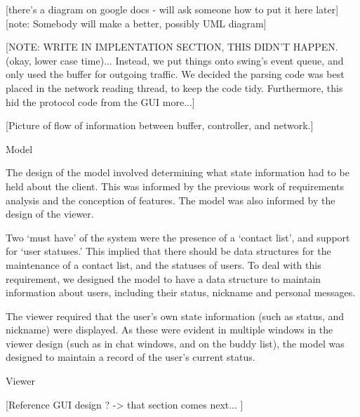 [there's a diagram on google docs - will ask someone how to put it here later]
[note: Somebody will make a better, possibly UML diagram]

[NOTE: WRITE IN IMPLENTATION SECTION, THIS DIDN’T HAPPEN. (okay, lower case time)... Instead, we put things onto swing’s event queue, and only used the buffer for outgoing traffic. We decided the parsing code was best placed in the network reading thread, to keep the code tidy. Furthermore, this hid the protocol code from the GUI more...]

[Picture of flow of information between buffer, controller, and network.]

Model

The design of the model involved determining what state information had to be held about the client. This was informed by the previous work of requirements analysis and the conception of features. The model was also informed by the design of the viewer.

Two ‘must have’ of the system were the presence of a ‘contact list’, and support for ‘user statuses.’ This implied that there should be data structures for the maintenance of a contact list, and the statuses of users. To deal with this requirement, we designed the model to have a data structure to maintain information about users, including their status, nickname and personal messages. 

The viewer required that the user’s own state information (such as status, and nickname) were displayed. As these were evident in multiple windows in the viewer design (such as in chat windows, and on the buddy list), the model was designed to maintain a record of the user’s current status. 

Viewer

[Reference GUI design ? -> that section comes next... ]


\subsubsection{}





